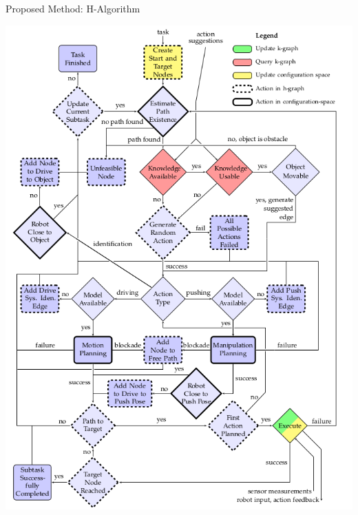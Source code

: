 \begin{frame}[fragile]{Proposed Method: H-Algorithm}
  \vspace{-0.5cm}
  \begin{center}
    \includegraphics[height=0.9\textheight]{figures/proposed_method/tikz_flowchart_halgorithm}
  \end{center}
\end{frame}

